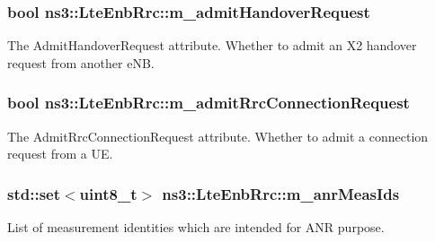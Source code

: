 \subsubsection[{\texorpdfstring{m\+\_\+admit\+Handover\+Request}{m_admitHandoverRequest}}]{\setlength{\rightskip}{0pt plus 5cm}bool ns3\+::\+Lte\+Enb\+Rrc\+::m\+\_\+admit\+Handover\+Request\hspace{0.3cm}{\ttfamily [private]}}\hypertarget{classns3_1_1LteEnbRrc_a727e2ef6a1438fce36c1d6236180364b}{}\label{classns3_1_1LteEnbRrc_a727e2ef6a1438fce36c1d6236180364b}
The {\ttfamily Admit\+Handover\+Request} attribute. Whether to admit an X2 handover request from another e\+NB. 
\subsubsection[{\texorpdfstring{m\+\_\+admit\+Rrc\+Connection\+Request}{m_admitRrcConnectionRequest}}]{\setlength{\rightskip}{0pt plus 5cm}bool ns3\+::\+Lte\+Enb\+Rrc\+::m\+\_\+admit\+Rrc\+Connection\+Request\hspace{0.3cm}{\ttfamily [private]}}\hypertarget{classns3_1_1LteEnbRrc_abe8ea555ca7235035d4fd13b35d12bd5}{}\label{classns3_1_1LteEnbRrc_abe8ea555ca7235035d4fd13b35d12bd5}
The {\ttfamily Admit\+Rrc\+Connection\+Request} attribute. Whether to admit a connection request from a UE. 
\subsubsection[{\texorpdfstring{m\+\_\+anr\+Meas\+Ids}{m_anrMeasIds}}]{\setlength{\rightskip}{0pt plus 5cm}std\+::set$<$uint8\+\_\+t$>$ ns3\+::\+Lte\+Enb\+Rrc\+::m\+\_\+anr\+Meas\+Ids\hspace{0.3cm}{\ttfamily [private]}}\hypertarget{classns3_1_1LteEnbRrc_a2a7403d83c681878a4e5acbc9170aa8f}{}\label{classns3_1_1LteEnbRrc_a2a7403d83c681878a4e5acbc9170aa8f}


List of measurement identities which are intended for A\+NR purpose. 

